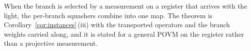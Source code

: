 
When the branch is selected by a measurement on a register that arrives with
the light, the per-branch squashers combine into one map. The theorem is
Corollary~\ref{cor:instances}\,(iii) with the transported operators and the
branch weights carried along, and it is stated for a general POVM on the
register rather than a projective measurement.

